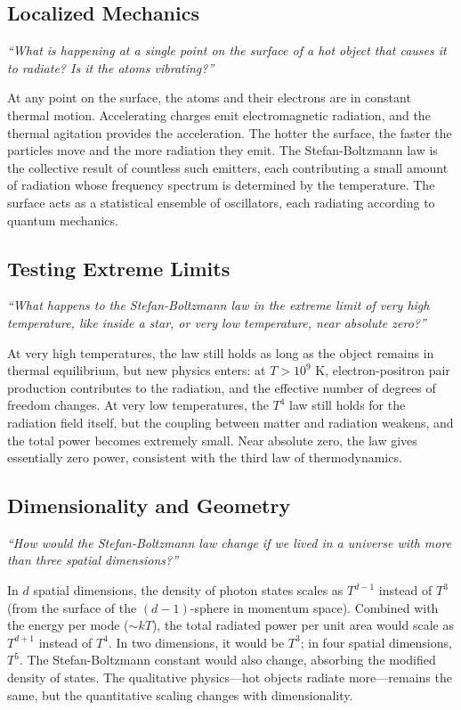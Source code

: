 \documentclass[11pt,openright]{book}
\begin{document}
\subsection*{Localized Mechanics}
\textit{``What is happening at a single point on the surface of a hot object that causes it to radiate? Is it the atoms vibrating?''}

At any point on the surface, the atoms and their electrons are in constant thermal motion. Accelerating charges emit electromagnetic radiation, and the thermal agitation provides the acceleration. The hotter the surface, the faster the particles move and the more radiation they emit. The Stefan-Boltzmann law is the collective result of countless such emitters, each contributing a small amount of radiation whose frequency spectrum is determined by the temperature. The surface acts as a statistical ensemble of oscillators, each radiating according to quantum mechanics.

\subsection*{Testing Extreme Limits}
\textit{``What happens to the Stefan-Boltzmann law in the extreme limit of very high temperature, like inside a star, or very low temperature, near absolute zero?''}

At very high temperatures, the law still holds as long as the object remains in thermal equilibrium, but new physics enters: at $T > 10^9$ K, electron-positron pair production contributes to the radiation, and the effective number of degrees of freedom changes. At very low temperatures, the $T^4$ law still holds for the radiation field itself, but the coupling between matter and radiation weakens, and the total power becomes extremely small. Near absolute zero, the law gives essentially zero power, consistent with the third law of thermodynamics.

\subsection*{Dimensionality and Geometry}
\textit{``How would the Stefan-Boltzmann law change if we lived in a universe with more than three spatial dimensions?''}

In $d$ spatial dimensions, the density of photon states scales as $T^{d-1}$ instead of $T^3$ (from the surface of the $(d-1)$-sphere in momentum space). Combined with the energy per mode ($\sim kT$), the total radiated power per unit area would scale as $T^{d+1}$ instead of $T^4$. In two dimensions, it would be $T^3$; in four spatial dimensions, $T^5$. The Stefan-Boltzmann constant would also change, absorbing the modified density of states. The qualitative physics---hot objects radiate more---remains the same, but the quantitative scaling changes with dimensionality.
\end{document}
